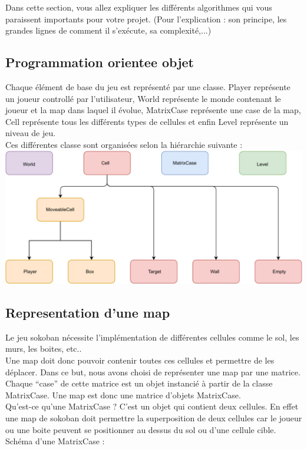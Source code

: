 \documentclass[../main.tex]{subfiles}
\begin{document}
Dans cette section, vous allez expliquer les différents algorithmes qui vous paraissent importants pour votre projet. (Pour l'explication : son principe, les grandes lignes de comment il s'exécute, sa complexité,...)

\subsection{Programmation orientee objet}
Chaque élément de base du jeu est représenté par une classe. Player représente un joueur controllé par l'utilisateur, World représente le monde contenant le joueur et la map dans laquel il évolue, MatrixCase représente une case de la map, Cell représente tous les différents types de cellules et enfin Level représente un niveau de jeu.\\
Ces différentes classe sont organisées selon la hiérarchie suivante :\\

\includegraphics[width=1\textwidth,clip]{images/objects.pdf}

\subsection{Representation d'une map}
Le jeu sokoban nécessite l'implémentation de différentes cellules comme le sol, les murs, les boites, etc.. \\
Une map doit donc pouvoir contenir toutes ces cellules et permettre de les déplacer. Dans ce but, nous avons choisi de représenter une map
par une matrice. Chaque ``case'' de cette matrice est un objet instancié à partir de la classe MatrixCase. Une map est donc une matrice d'objets MatrixCase.\\
Qu'est-ce qu'une MatrixCase ? C'est un objet qui contient deux cellules. En effet une map de sokoban doit permettre la superposition de deux cellules car le joueur ou une boite peuvent se positionner au dessus du sol ou d'une cellule cible.
Schéma d'une MatrixCase :\\
\end{document}
